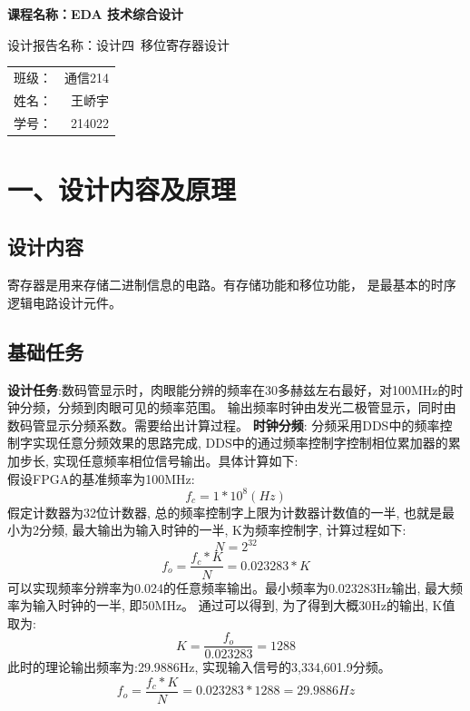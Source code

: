 \documentclass{article}
\newcommand{\fourhao}{\fontsize{14pt}{\baselineskip}\selectfont} %
\newcommand{\xiaosihao}{\fontsize{12pt}{\baselineskip}\selectfont} %
\begin{document}
\begin{titlepage}
    \centering
    \vspace*{2cm}

    \Huge
    \textbf{课程名称：EDA 技术综合设计}

    \vspace{2cm}

    \LARGE
    设计报告名称：设计四\ 移位寄存器设计

    \vspace{4cm}

    \centering
    \Large
    \begin{tabular}{rl}
        班级： & 通信214    \\
        姓名： & \ 王峤宇   \\
        学号： & \ 214022
    \end{tabular}

    \vfill

    \vspace{1cm}
\end{titlepage}

\newpage
\section*{\fourhao 一、设计内容及原理}
\xiaosihao
{}
\subsection*{设计内容}
寄存器是用来存储二进制信息的电路。有存储功能和移位功能， 是最基本的时序逻辑电路设计元件。
\subsection*{基础任务}
\textbf{设计任务}:数码管显示时，肉眼能分辨的频率在30多赫兹左右最好，对100MHz的时钟分频，分频到肉眼可见的频率范围。
输出频率时钟由发光二极管显示，同时由数码管显示分频系数。需要给出计算过程。
\textbf{时钟分频}: 分频采用DDS中的频率控制字实现任意分频效果的思路完成, DDS中的通过频率控制字控制相位累加器的累加步长, 
实现任意频率相位信号输出。具体计算如下:\\
假设FPGA的基准频率为100MHz:
\begin{equation}
    f_c = 1*10^8 (Hz)
\end{equation}
假定计数器为32位计数器, 总的频率控制字上限为计数器计数值的一半, 也就是最小为2分频, 最大输出为输入时钟的一半, K为频率控制字, 计算过程如下:
\begin{equation}
    N = 2^{32}
\end{equation}
\begin{equation}
    f_o = \frac{f_c*K}{N} = 0.023283 * K
\end{equation}
可以实现频率分辨率为0.024的任意频率输出。最小频率为0.023283Hz输出, 最大频率为输入时钟的一半, 即50MHz。
通过可以得到, 为了得到大概30Hz的输出, K值取为:
\begin{equation}
    K = \frac{f_o}{0.023283} = 1288
\end{equation}
此时的理论输出频率为:29.9886Hz, 实现输入信号的3,334,601.9分频。
\begin{equation}
    f_o = \frac{f_c*K}{N} = 0.023283 * 1288 = 29.9886Hz
\end{equation}
\end{document}
